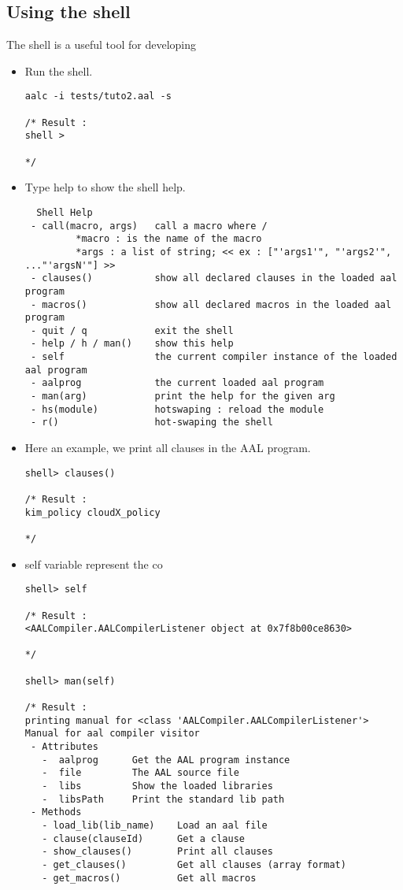 \subsection{Using the shell}
The shell is a useful tool for developing 


{
\lstset{style=shell}

\begin{itemize}
	\item Run the shell.
\begin{lstlisting}
aalc -i tests/tuto2.aal -s

/* Result : 
shell >

*/
\end{lstlisting}

  \item Type help to show the shell help.
\begin{lstlisting}
  Shell Help
 - call(macro, args)   call a macro where /
         *macro : is the name of the macro
         *args : a list of string; << ex : ["'args1'", "'args2'", ..."'argsN'"] >>
 - clauses()           show all declared clauses in the loaded aal program
 - macros()            show all declared macros in the loaded aal program
 - quit / q            exit the shell
 - help / h / man()    show this help
 - self                the current compiler instance of the loaded aal program
 - aalprog             the current loaded aal program 
 - man(arg)            print the help for the given arg
 - hs(module)          hotswaping : reload the module
 - r()                 hot-swaping the shell
\end{lstlisting}

  \item Here an example, we print all clauses in the AAL program.
\begin{lstlisting}
shell> clauses()

/* Result :
kim_policy cloudX_policy 

*/
\end{lstlisting}

  \item self variable represent the co
\begin{lstlisting}
shell> self

/* Result :
<AALCompiler.AALCompilerListener object at 0x7f8b00ce8630>

*/

shell> man(self)

/* Result :
printing manual for <class 'AALCompiler.AALCompilerListener'>
Manual for aal compiler visitor
 - Attributes
   -  aalprog      Get the AAL program instance
   -  file         The AAL source file
   -  libs         Show the loaded libraries
   -  libsPath     Print the standard lib path
 - Methods
   - load_lib(lib_name)    Load an aal file
   - clause(clauseId)      Get a clause
   - show_clauses()        Print all clauses
   - get_clauses()         Get all clauses (array format)
   - get_macros()          Get all macros


\end{lstlisting}
\end{itemize}}
